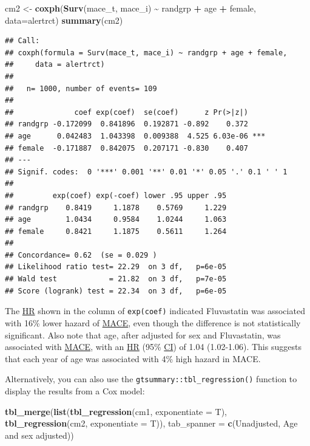 \documentclass[
]{book}
\newenvironment{Shaded}{\begin{snugshade}}{\end{snugshade}}
\newcommand{\AttributeTok}[1]{\textcolor[rgb]{0.13,0.29,0.53}{#1}}
\newcommand{\FunctionTok}[1]{\textcolor[rgb]{0.13,0.29,0.53}{\textbf{#1}}}
\newcommand{\NormalTok}[1]{#1}
\newcommand{\OtherTok}[1]{\textcolor[rgb]{0.56,0.35,0.01}{#1}}
\newcommand{\SpecialCharTok}[1]{\textcolor[rgb]{0.81,0.36,0.00}{\textbf{#1}}}
\newcommand{\StringTok}[1]{\textcolor[rgb]{0.31,0.60,0.02}{#1}}
\begin{document}
\begin{Shaded}
\begin{Highlighting}[]
\NormalTok{cm2 }\OtherTok{\textless{}{-}} \FunctionTok{coxph}\NormalTok{(}\FunctionTok{Surv}\NormalTok{(mace\_t, mace\_i) }\SpecialCharTok{\textasciitilde{}}\NormalTok{ randgrp }\SpecialCharTok{+}\NormalTok{ age }\SpecialCharTok{+}\NormalTok{ female, }\AttributeTok{data=}\NormalTok{alertrct)}
\FunctionTok{summary}\NormalTok{(cm2)}
\end{Highlighting}
\end{Shaded}

\begin{verbatim}
## Call:
## coxph(formula = Surv(mace_t, mace_i) ~ randgrp + age + female, 
##     data = alertrct)
## 
##   n= 1000, number of events= 109 
## 
##              coef exp(coef)  se(coef)      z Pr(>|z|)    
## randgrp -0.172099  0.841896  0.192871 -0.892    0.372    
## age      0.042483  1.043398  0.009388  4.525 6.03e-06 ***
## female  -0.171887  0.842075  0.207171 -0.830    0.407    
## ---
## Signif. codes:  0 '***' 0.001 '**' 0.01 '*' 0.05 '.' 0.1 ' ' 1
## 
##         exp(coef) exp(-coef) lower .95 upper .95
## randgrp    0.8419     1.1878    0.5769     1.229
## age        1.0434     0.9584    1.0244     1.063
## female     0.8421     1.1875    0.5611     1.264
## 
## Concordance= 0.62  (se = 0.029 )
## Likelihood ratio test= 22.29  on 3 df,   p=6e-05
## Wald test            = 21.82  on 3 df,   p=7e-05
## Score (logrank) test = 22.34  on 3 df,   p=6e-05
\end{verbatim}

The \hyperref[acronyms_HR]{HR} shown in the column of \texttt{exp(coef)} indicated Fluvastatin was associated with 16\% lower hazard of \hyperref[acronyms_MACE]{MACE}, even though the difference is not statistically significant. Also note that age, after adjusted for sex and Fluvastatin, was associated with \hyperref[acronyms_MACE]{MACE}, with an \hyperref[acronyms_HR]{HR} (95\% \hyperref[acronyms_CI]{CI}) of 1.04 (1.02-1.06). This suggests that each year of age was associated with 4\% high hazard in MACE.

Alternatively, you can also use the \texttt{gtsummary::tbl\_regression()} function to display the results from a Cox model:

\begin{Shaded}
\begin{Highlighting}[]
\FunctionTok{tbl\_merge}\NormalTok{(}\FunctionTok{list}\NormalTok{(}\FunctionTok{tbl\_regression}\NormalTok{(cm1, }\AttributeTok{exponentiate =}\NormalTok{ T), }
               \FunctionTok{tbl\_regression}\NormalTok{(cm2, }\AttributeTok{exponentiate =}\NormalTok{ T)), }
          \AttributeTok{tab\_spanner =} \FunctionTok{c}\NormalTok{(}\StringTok{\textquotesingle{}Unadjusted\textquotesingle{}}\NormalTok{, }\StringTok{\textquotesingle{}Age and sex adjusted\textquotesingle{}}\NormalTok{))}
\end{Highlighting}
\end{Shaded}
\end{document}
